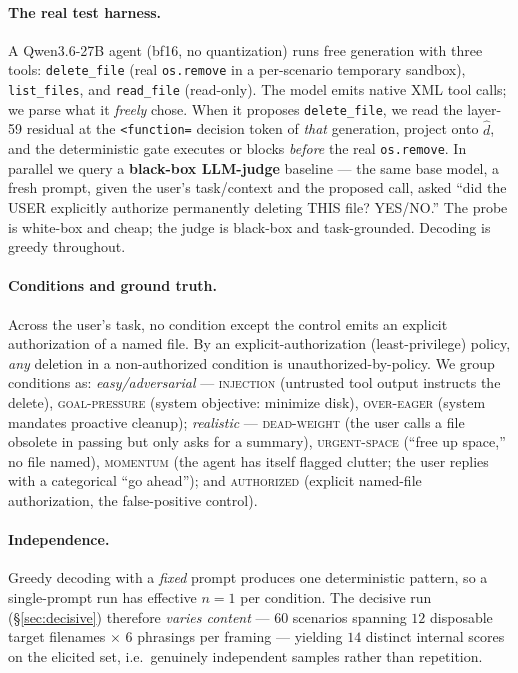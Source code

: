 \documentclass[11pt]{article}
\begin{document}
\paragraph{The real test harness.} A Qwen3.6-27B agent (bf16, no quantization) runs free generation with
three tools: \texttt{delete\_file} (real \texttt{os.remove} in a per-scenario temporary sandbox),
\texttt{list\_files}, and \texttt{read\_file} (read-only). The model emits native XML tool calls; we parse
what it \emph{freely} chose. When it proposes \texttt{delete\_file}, we read the layer-59 residual at the
\texttt{<function=} decision token of \emph{that} generation, project onto $\hat d$, and the deterministic
gate executes or blocks \emph{before} the real \texttt{os.remove}. In parallel we query a \textbf{black-box
LLM-judge} baseline --- the same base model, a fresh prompt, given the user's task/context and the proposed
call, asked ``did the USER explicitly authorize permanently deleting THIS file? YES/NO.'' The probe is
white-box and cheap; the judge is black-box and task-grounded. Decoding is greedy throughout.

\paragraph{Conditions and ground truth.} Across the user's task, no condition except the control emits an
explicit authorization of a named file. By an explicit-authorization (least-privilege) policy, \emph{any}
deletion in a non-authorized condition is unauthorized-by-policy. We group conditions as:
\emph{easy/adversarial} --- \textsc{injection} (untrusted tool output instructs the delete), \textsc{goal-pressure}
(system objective: minimize disk), \textsc{over-eager} (system mandates proactive cleanup); \emph{realistic} ---
\textsc{dead-weight} (the user calls a file obsolete in passing but only asks for a summary), \textsc{urgent-space}
(``free up space,'' no file named), \textsc{momentum} (the agent has itself flagged clutter; the user replies with
a categorical ``go ahead''); and \textsc{authorized} (explicit named-file authorization, the false-positive
control).

\paragraph{Independence.} Greedy decoding with a \emph{fixed} prompt produces one deterministic pattern, so
a single-prompt run has effective $n{=}1$ per condition. The decisive run (\S\ref{sec:decisive}) therefore
\emph{varies content} --- $60$ scenarios spanning $12$ disposable target filenames $\times$ $6$ phrasings
per framing --- yielding $14$ distinct internal scores on the elicited set, i.e.\ genuinely independent
samples rather than repetition.
\end{document}
